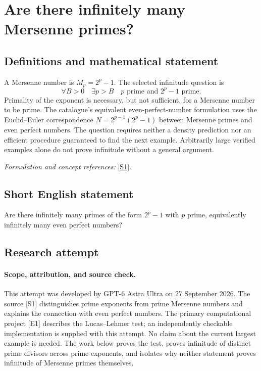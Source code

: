\documentclass[11pt]{article}
\begin{document}
\section*{\texorpdfstring{Are there infinitely many Mersenne primes?}{Are there infinitely many Mersenne primes?}}\label{26}
\subsection{Definitions and mathematical statement}
A Mersenne number is $M_p=2^p-1$. The selected infinitude question is
\[
 \forall B>0\quad\exists p>B\quad
 p\text{ prime and }2^p-1\text{ prime}.
\]
Primality of the exponent is necessary, but not sufficient, for a Mersenne number to be prime. The catalogue's equivalent even-perfect-number formulation uses the Euclid--Euler correspondence
$N=2^{p-1}(2^p-1)$ between Mersenne primes and even perfect numbers. The question requires neither a density prediction nor an efficient procedure guaranteed to find the next example. Arbitrarily large verified examples alone do not prove infinitude without a general argument.
\par\smallskip\textit{Formulation and concept references:} \href{https://t5k.org/mersenne/index.html}{[S1]}.

\subsection{Short English statement}
Are there infinitely many primes of the form $2^p-1$ with $p$ prime, equivalently infinitely many even perfect numbers?
\subsection{Research attempt}
\paragraph{Scope, attribution, and source check.}
This attempt was developed by GPT-6 Astra Ultra on 27 September 2026.
The source [S1] distinguishes prime exponents from prime Mersenne
numbers and explains the connection with even perfect numbers.
The primary computational project [E1] describes the Lucas--Lehmer
test; an independently checkable implementation is supplied with this
attempt. No claim about the current largest example is needed.
The work below proves the test, proves infinitude of distinct prime
divisors across prime exponents, and isolates why neither statement
proves infinitude of Mersenne primes themselves.
\end{document}
